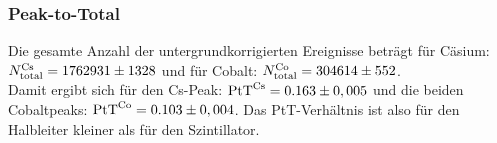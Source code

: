 \subsubsection*{Peak-to-Total}
Die gesamte Anzahl der untergrundkorrigierten Ereignisse beträgt für Cäsium: $N_\mathrm{total}^\mathrm{Cs} = 1762931 \pm 1328$ und für Cobalt: $N_\mathrm{total}^\mathrm{Co} = 304614\pm 552$.\\
Damit ergibt sich für den Cs-Peak: $\text{PtT}^\mathrm{Cs} = 0.163\pm 0,005$ und die beiden Cobaltpeaks: $\text{PtT}^\mathrm{Co} = 0.103\pm 0,004$. Das PtT-Verhältnis ist also für den Halbleiter kleiner als für den Szintillator.